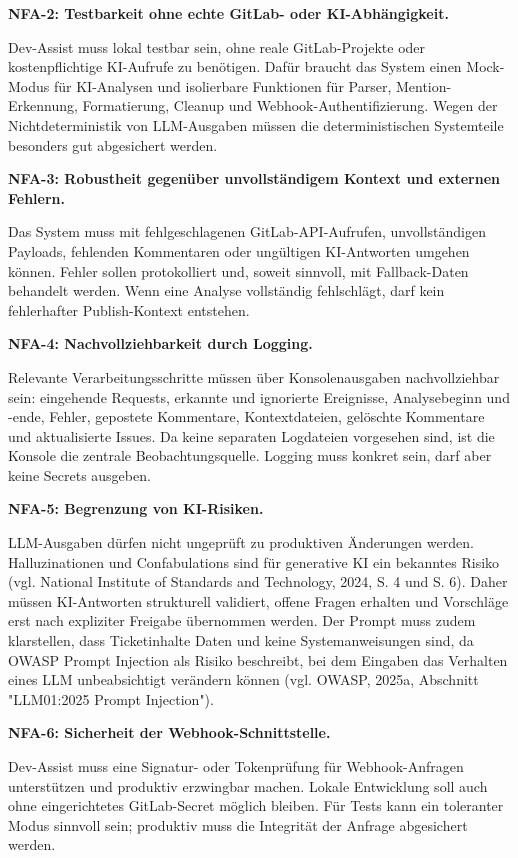 \documentclass[12pt,a4paper,oneside]{scrreprt}
\begin{document}
\textbf{NFA-2: Testbarkeit ohne echte GitLab- oder KI-Abhängigkeit.}

Dev-Assist muss lokal testbar sein, ohne reale GitLab-Projekte oder kostenpflichtige KI-Aufrufe zu benötigen. Dafür braucht das System einen Mock-Modus für KI-Analysen und isolierbare Funktionen für Parser, Mention-Erkennung, Formatierung, Cleanup und Webhook-Authentifizierung. Wegen der Nichtdeterministik von LLM-Ausgaben müssen die deterministischen Systemteile besonders gut abgesichert werden.

\textbf{NFA-3: Robustheit gegenüber unvollständigem Kontext und externen Fehlern.}

Das System muss mit fehlgeschlagenen GitLab-API-Aufrufen, unvollständigen Payloads, fehlenden Kommentaren oder ungültigen KI-Antworten umgehen können. Fehler sollen protokolliert und, soweit sinnvoll, mit Fallback-Daten behandelt werden. Wenn eine Analyse vollständig fehlschlägt, darf kein fehlerhafter Publish-Kontext entstehen.

\textbf{NFA-4: Nachvollziehbarkeit durch Logging.}

Relevante Verarbeitungsschritte müssen über Konsolenausgaben nachvollziehbar sein: eingehende Requests, erkannte und ignorierte Ereignisse, Analysebeginn und -ende, Fehler, gepostete Kommentare, Kontextdateien, gelöschte Kommentare und aktualisierte Issues. Da keine separaten Logdateien vorgesehen sind, ist die Konsole die zentrale Beobachtungsquelle. Logging muss konkret sein, darf aber keine Secrets ausgeben.

\textbf{NFA-5: Begrenzung von KI-Risiken.}

LLM-Ausgaben dürfen nicht ungeprüft zu produktiven Änderungen werden. Halluzinationen und Confabulations sind für generative KI ein bekanntes Risiko (vgl. National Institute of Standards and Technology, 2024, S. 4 und S. 6). Daher müssen KI-Antworten strukturell validiert, offene Fragen erhalten und Vorschläge erst nach expliziter Freigabe übernommen werden. Der Prompt muss zudem klarstellen, dass Ticketinhalte Daten und keine Systemanweisungen sind, da OWASP Prompt Injection als Risiko beschreibt, bei dem Eingaben das Verhalten eines LLM unbeabsichtigt verändern können (vgl. OWASP, 2025a, Abschnitt "LLM01:2025 Prompt Injection").

\textbf{NFA-6: Sicherheit der Webhook-Schnittstelle.}

Dev-Assist muss eine Signatur- oder Tokenprüfung für Webhook-Anfragen unterstützen und produktiv erzwingbar machen. Lokale Entwicklung soll auch ohne eingerichtetes GitLab-Secret möglich bleiben. Für Tests kann ein toleranter Modus sinnvoll sein; produktiv muss die Integrität der Anfrage abgesichert werden.
\end{document}
